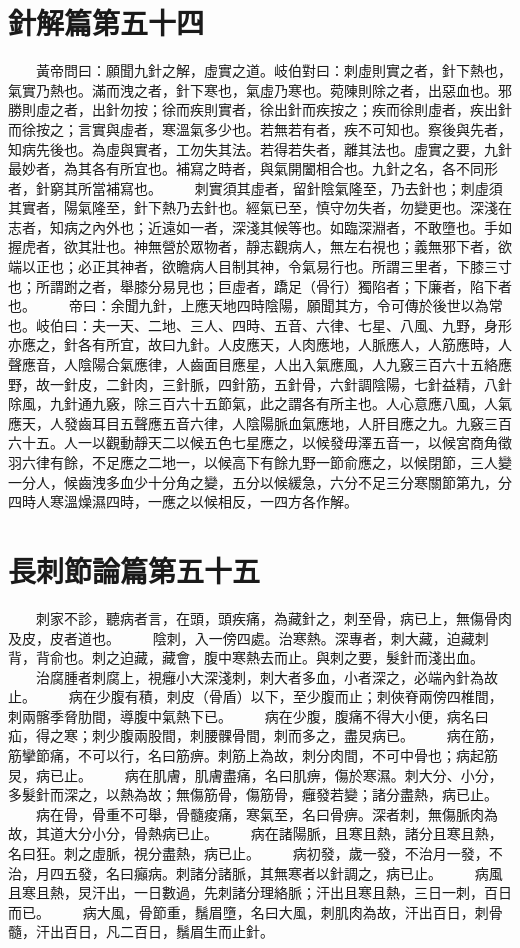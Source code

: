 \section{針解篇第五十四}

　　黃帝問曰：願聞九針之解，虛實之道。岐伯對曰：刺虛則實之者，針下熱也，氣實乃熱也。滿而洩之者，針下寒也，氣虛乃寒也。菀陳則除之者，出惡血也。邪勝則虛之者，出針勿按；徐而疾則實者，徐出針而疾按之；疾而徐則虛者，疾出針而徐按之；言實與虛者，寒溫氣多少也。若無若有者，疾不可知也。察後與先者，知病先後也。為虛與實者，工勿失其法。若得若失者，離其法也。虛實之要，九針最妙者，為其各有所宜也。補寫之時者，與氣開闔相合也。九針之名，各不同形者，針窮其所當補寫也。
　　刺實須其虛者，留針陰氣隆至，乃去針也；刺虛須其實者，陽氣隆至，針下熱乃去針也。經氣已至，慎守勿失者，勿變更也。深淺在志者，知病之內外也；近遠如一者，深淺其候等也。如臨深淵者，不敢墮也。手如握虎者，欲其壯也。神無營於眾物者，靜志觀病人，無左右視也；義無邪下者，欲端以正也；必正其神者，欲瞻病人目制其神，令氣易行也。所謂三里者，下膝三寸也；所謂跗之者，舉膝分易見也；巨虛者，蹻足（骨行）獨陷者；下廉者，陷下者也。
　　帝曰：余聞九針，上應天地四時陰陽，願聞其方，令可傳於後世以為常也。岐伯曰：夫一天、二地、三人、四時、五音、六律、七星、八風、九野，身形亦應之，針各有所宜，故曰九針。人皮應天，人肉應地，人脈應人，人筋應時，人聲應音，人陰陽合氣應律，人齒面目應星，人出入氣應風，人九竅三百六十五絡應野，故一針皮，二針肉，三針脈，四針筋，五針骨，六針調陰陽，七針益精，八針除風，九針通九竅，除三百六十五節氣，此之謂各有所主也。人心意應八風，人氣應天，人發齒耳目五聲應五音六律，人陰陽脈血氣應地，人肝目應之九。九竅三百六十五。人一以觀動靜天二以候五色七星應之，以候發毋澤五音一，以候宮商角徵羽六律有餘，不足應之二地一，以候高下有餘九野一節俞應之，以候閉節，三人變一分人，候齒洩多血少十分角之變，五分以候緩急，六分不足三分寒關節第九，分四時人寒溫燥濕四時，一應之以候相反，一四方各作解。


\section{長刺節論篇第五十五}

　　刺家不診，聽病者言，在頭，頭疾痛，為藏針之，刺至骨，病已上，無傷骨肉及皮，皮者道也。
　　陰刺，入一傍四處。治寒熱。深專者，刺大藏，迫藏刺背，背俞也。刺之迫藏，藏會，腹中寒熱去而止。與刺之要，髮針而淺出血。
　　治腐腫者刺腐上，視癰小大深淺刺，刺大者多血，小者深之，必端內針為故止。
　　病在少腹有積，刺皮（骨盾）以下，至少腹而止；刺俠脊兩傍四椎間，刺兩髂季脅肋間，導腹中氣熱下已。
　　病在少腹，腹痛不得大小便，病名曰疝，得之寒；刺少腹兩股間，刺腰髁骨間，刺而多之，盡炅病已。
　　病在筋，筋攣節痛，不可以行，名曰筋痹。刺筋上為故，刺分肉間，不可中骨也；病起筋炅，病已止。
　　病在肌膚，肌膚盡痛，名曰肌痹，傷於寒濕。刺大分、小分，多髮針而深之，以熱為故；無傷筋骨，傷筋骨，癰發若變；諸分盡熱，病已止。
　　病在骨，骨重不可舉，骨髓痠痛，寒氣至，名曰骨痹。深者刺，無傷脈肉為故，其道大分小分，骨熱病已止。
　　病在諸陽脈，且寒且熱，諸分且寒且熱，名曰狂。刺之虛脈，視分盡熱，病已止。
　　病初發，歲一發，不治月一發，不治，月四五發，名曰癲病。刺諸分諸脈，其無寒者以針調之，病已止。
　　病風且寒且熱，炅汗出，一日數過，先刺諸分理絡脈；汗出且寒且熱，三日一刺，百日而已。
　　病大風，骨節重，鬚眉墮，名曰大風，刺肌肉為故，汗出百日，刺骨髓，汗出百日，凡二百日，鬚眉生而止針。


